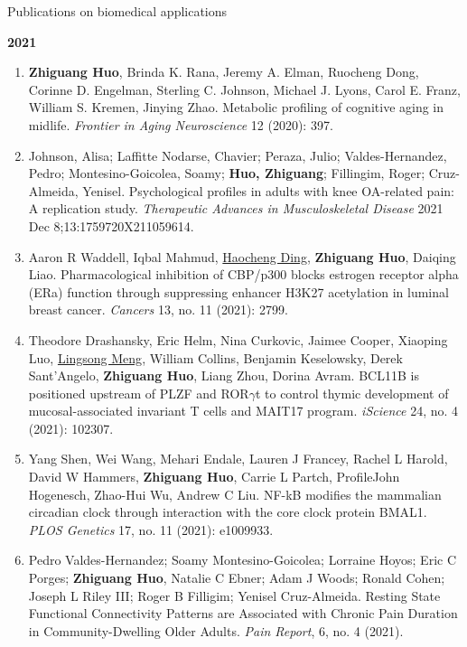 \documentclass{resume} %
\begin{document}
\begin{rSection}{Publications on biomedical applications}
\begin{enumerate}[noitemsep,topsep=0pt, resume]
\end{enumerate}



\textbf{2021}
\begin{enumerate}[noitemsep,topsep=0pt, resume]

\item  {\bf Zhiguang Huo}, Brinda K. Rana, Jeremy A. Elman, Ruocheng Dong, Corinne D. Engelman, Sterling C. Johnson, Michael J. Lyons, Carol E. Franz, William S. Kremen, Jinying Zhao.
Metabolic profiling of cognitive aging in midlife.
\emph{Frontier in Aging Neuroscience} 12 (2020): 397.

\item
Johnson, Alisa; Laffitte Nodarse, Chavier; Peraza, Julio; Valdes-Hernandez, Pedro; Montesino-Goicolea, Soamy; {\bf Huo, Zhiguang}; Fillingim, Roger; Cruz-Almeida, Yenisel. 
Psychological profiles in adults with knee OA-related pain: A replication study.
\emph{Therapeutic Advances in Musculoskeletal Disease} 2021 Dec 8;13:1759720X211059614.

\item
Aaron R Waddell, Iqbal Mahmud, \underline{Haocheng Ding}, {\bf Zhiguang Huo}, Daiqing Liao. 
Pharmacological inhibition of CBP/p300 blocks estrogen receptor alpha (ERa) function through suppressing enhancer H3K27 acetylation in luminal breast cancer.
\emph{Cancers} 13, no. 11 (2021): 2799.

\item
Theodore Drashansky, Eric Helm, Nina Curkovic, Jaimee Cooper, Xiaoping Luo, \underline{Lingsong Meng}, William Collins, Benjamin Keselowsky, Derek Sant'Angelo, {\bf Zhiguang Huo}, Liang Zhou, Dorina Avram.
BCL11B is positioned upstream of PLZF and ROR$\gamma$t to control thymic development of mucosal-associated invariant T cells and MAIT17 program.
\emph{iScience}  24, no. 4 (2021): 102307.

\item  
Yang Shen, Wei Wang, Mehari Endale, Lauren J Francey, Rachel L Harold, David W Hammers, {\bf Zhiguang Huo}, Carrie L Partch, ProfileJohn Hogenesch, Zhao-Hui Wu, Andrew C Liu.
NF-kB modifies the mammalian circadian clock through interaction with the core clock protein BMAL1.
\emph{PLOS Genetics} 17, no. 11 (2021): e1009933.


\item 
 Pedro Valdes-Hernandez; Soamy Montesino-Goicolea; Lorraine Hoyos; Eric C Porges; {\bf Zhiguang Huo}, Natalie C Ebner; Adam J Woods; Ronald Cohen; Joseph L Riley III; Roger B Filligim; Yenisel Cruz-Almeida. 
 Resting State Functional Connectivity Patterns are Associated with Chronic Pain Duration in Community-Dwelling Older Adults. 
\emph{Pain Report},  6, no. 4 (2021).



\end{enumerate}
\end{rSection}
\end{document}

